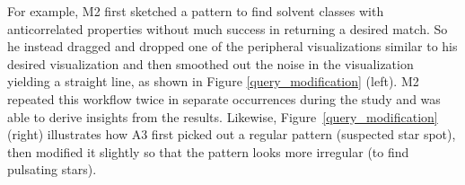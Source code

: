 For example, M2 first sketched a pattern 
to find solvent classes with anticorrelated 
properties without much success in returning a desired match.
So he instead dragged and dropped one 
of the peripheral visualizations similar 
to his desired visualization and then smoothed 
out the noise in the visualization yielding
a straight line, 
as shown in Figure \ref{query_modification} (left). 
M2 repeated this workflow twice in separate 
occurrences during the study and 
was able to derive insights from the results. 
Likewise, Figure~\ref{query_modification} (right) 
illustrates how A3 first picked out a regular pattern 
(suspected star spot), then modified it slightly 
so that the pattern looks more irregular (to find pulsating stars). %
